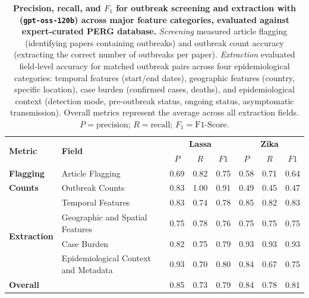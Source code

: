 \begin{table}[t!]
\centering
\caption{\textbf{Precision, recall, and $F_1$ for outbreak screening and extraction with \name{} (\texttt{gpt-oss-120b}) across major feature categories, evaluated against expert-curated PERG database.} \textit{Screening} measured article flagging (identifying papers containing outbreaks) and outbreak count accuracy (extracting the correct number of outbreaks per paper). \textit{Extraction} evaluated field-level accuracy for matched outbreak pairs across four epidemiological categories: temporal features (start/end dates), geographic features (country, specific location), case burden (confirmed cases, deaths), and epidemiological context (detection mode, pre-outbreak status, ongoing status, asymptomatic transmission). Overall metrics represent the average across all extraction fields. $P=\text{precision}$; $R=\text{recall}$; $F_1=\text{F1-Score}$.}
\renewcommand{\arraystretch}{1}
{\footnotesize
\label{tab:outbreak_aggregated_metrics}
\begin{tabular}{ll|ccc|ccc}
\toprule
 \multirow{2}{*}{\bf Metric} & \multirow{2}{*}{\bf Field}
 & \multicolumn{3}{c}{\textbf{Lassa}}
 & \multicolumn{3}{c}{\textbf{Zika}} \\
 & & $P$ & $R$ & $F1$ & $P$ & $R$ & $F1$ \\
\midrule
\bf Flagging & Article Flagging & 0.69 & 0.82 & 0.75 & 0.58 & 0.71 & 0.64 \\
\midrule
\bf Counts & Outbreak Counts & 0.83 & 1.00 & 0.91 & 0.49 & 0.45 & 0.47 \\
\midrule
\multirow{4}{*}{\textbf{Extraction}} & Temporal Features & 0.83 & 0.74 & 0.78 & 0.85 & 0.82 & 0.83 \\
 & Geographic and Spatial Features & 0.75 & 0.78 & 0.76 & 0.75 & 0.75 & 0.75 \\
 & Case Burden & 0.82 & 0.75 & 0.79 & 0.93 & 0.93 & 0.93 \\
 & Epidemiological Context and Metadata & 0.93 & 0.70 & 0.80 & 0.84 & 0.67 & 0.75 \\
\midrule
\textbf{Overall} &  & 0.85 & 0.73 & 0.79 & 0.84 & 0.78 & 0.81 \\
\bottomrule
\end{tabular}
}
\end{table}

